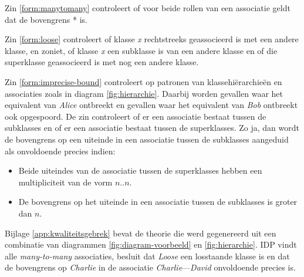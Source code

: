 Zin \ref{form:manytomany} controleert of voor beide rollen van een associatie geldt dat de bovengrens * is.

Zin \ref{form:loose} controleert of klasse \textit{x} rechtstreeks geassocieerd is met een andere klasse, en zoniet, of klasse \textit{x} een subklasse is van een andere klasse en of die superklasse geassocieerd is met nog een andere klasse.

Zin \ref{form:imprecise-bound} controleert op patronen van klassehi\"erarchie\"en en associaties zoals in diagram \ref{fig:hierarchie}. Daarbij worden gevallen waar het equivalent van \textit{Alice} ontbreekt en gevallen waar het equivalent van \textit{Bob} ontbreekt ook opgespoord. De zin controleert of er een associatie bestaat tussen de subklasses en of er een associatie bestaat tussen de superklasses. Zo ja, dan wordt de bovengrens op een uiteinde in een associatie tussen de subklasses aangeduid als onvoldoende precies indien:

\begin{itemize}
	\item Beide uiteindes van de associatie tussen de superklasses hebben een multipliciteit van de vorm $n..n$.
	\item De bovengrens op het uiteinde in een associatie tussen de subklasses is groter dan $n$.
\end{itemize}

Bijlage \ref{app:kwaliteitsgebrek} bevat de theorie die werd gegenereerd uit een combinatie van diagrammen \ref{fig:diagram-voorbeeld} en \ref{fig:hierarchie}. IDP
vindt alle \textit{many-to-many} associaties, besluit dat \textit{Loose} een losstaande klasse is en dat de bovengrens op \textit{Charlie} in de associatie \textit{Charlie}---\textit{David} onvoldoende precies is.